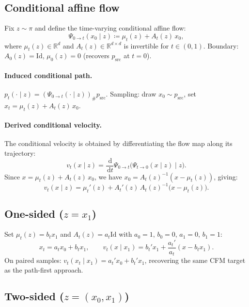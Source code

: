 \documentclass[11pt]{article}
\newcommand{\R}{\mathbb{R}}
\newcommand{\Id}{\mathrm{Id}}
\newcommand{\dd}{\,\mathrm{d}}
\theoremstyle{definition}
\theoremstyle{remark}
\begin{document}
\subsection{Conditional affine flow}

Fix $z\sim\pi$ and define the time-varying conditional affine flow:
\begin{equation}\label{eq:cond-affine-flow}
\Psi_{0\to t}(x_0\mid z) \coloneqq \mu_t(z) + A_t(z)\,x_0,
\end{equation}
where $\mu_t(z)\in\R^d$ and $A_t(z)\in\R^{d\times d}$ is invertible for $t\in(0,1)$.
Boundary: $A_0(z) = \Id$, $\mu_0(z) = 0$ (recovers $p_{\mathrm{src}}$ at $t=0$).

\paragraph{Induced conditional path.}
$p_t(\cdot\mid z) = (\Psi_{0\to t}(\cdot\mid z))_\# p_{\mathrm{src}}$.
Sampling: draw $x_0\sim p_{\mathrm{src}}$, set $x_t = \mu_t(z) + A_t(z)\,x_0$.

\paragraph{Derived conditional velocity.}
The conditional velocity is obtained by differentiating the flow map along its trajectory:
\begin{equation}\label{eq:flow-first-vf}
v_t(x\mid z) = \frac{\dd}{\dd t}\Psi_{0\to t}\!\big(\Psi_{t\to 0}(x\mid z)\mid z\big).
\end{equation}
Since $x = \mu_t(z) + A_t(z)\,x_0$, we have $x_0 = A_t(z)^{-1}(x - \mu_t(z))$, giving:
\begin{equation}\label{eq:cond-affine-vf}
v_t(x\mid z) = \mu_t'(z) + A_t'(z)\,A_t(z)^{-1}\big(x - \mu_t(z)\big).
\end{equation}

\subsection{One-sided ($z = x_1$)}

Set $\mu_t(z) = b_t x_1$ and $A_t(z) = a_t \Id$ with $a_0=1$, $b_0=0$, $a_1=0$, $b_1=1$:
\[
x_t = a_t x_0 + b_t x_1, \qquad v_t(x\mid x_1) = b_t' x_1 + \frac{a_t'}{a_t}(x - b_t x_1).
\]
On paired samples: $v_t(x_t\mid x_1) = a_t' x_0 + b_t' x_1$, recovering the same CFM target as the path-first approach.

\subsection{Two-sided ($z = (x_0, x_1)$)}
\end{document}
